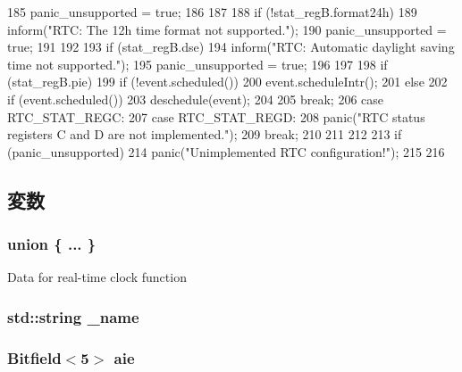 \begin{DoxyCode}
{{{{185                 panic_unsupported = true;
186             }
187 
188             if (!stat_regB.format24h) {
189                 inform("RTC: The 12h time format not supported.\n");
190                 panic_unsupported = true;
191             }
192 
193             if (stat_regB.dse) {
194                 inform("RTC: Automatic daylight saving time not supported.\n");
195                 panic_unsupported = true;
196             }
197 
198             if (stat_regB.pie) {
199                 if (!event.scheduled())
200                     event.scheduleIntr();
201             } else {
202                 if (event.scheduled())
203                     deschedule(event);
204             }
205             break;
206           case RTC_STAT_REGC:
207           case RTC_STAT_REGD:
208             panic("RTC status registers C and D are not implemented.\n");
209             break;
210         }
211     }
212 
213     if (panic_unsupported)
214         panic("Unimplemented RTC configuration!\n");
215 
216 }
\end{DoxyCode}


\subsection{変数}
\hypertarget{classMC146818_a9e3f8b9b4d76baaaf27eda22289b266d}{
\subsubsection[{"@60}]{\setlength{\rightskip}{0pt plus 5cm}union \{ ... \} }}
\label{classMC146818_a9e3f8b9b4d76baaaf27eda22289b266d}
Data for real-\/time clock function \hypertarget{classMC146818_aaf2ed934b37cbbd236fdd1b01a5f5005}{
\subsubsection[{\_\-name}]{\setlength{\rightskip}{0pt plus 5cm}std::string {\bf \_\-name}}}
\label{classMC146818_aaf2ed934b37cbbd236fdd1b01a5f5005}
\hypertarget{classMC146818_a074fd4d27a675086372d4d0f43e96c3c}{
\subsubsection[{aie}]{\setlength{\rightskip}{0pt plus 5cm}Bitfield$<$5$>$ {\bf aie}}}
\label{classMC146818_a074fd4d27a675086372d4d0f43e96c3c}


